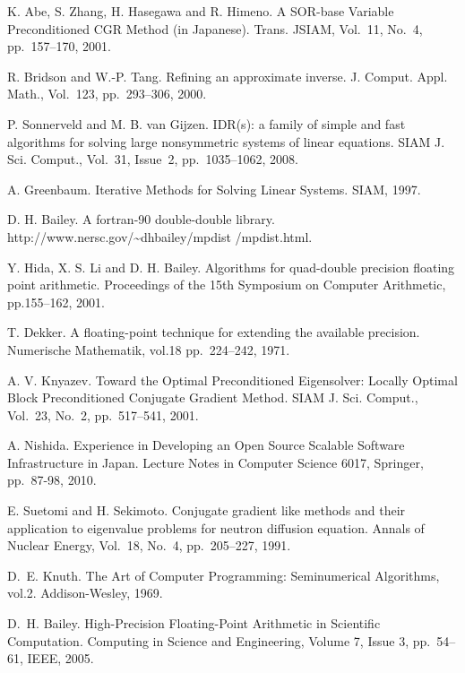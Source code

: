 \documentclass[a4paper]{article}
\begin{document}
\begin{thebibliography}{10}
K. Abe, S. Zhang, H. Hasegawa and R. Himeno.
\newblock A SOR-base Variable Preconditioned CGR Method (in Japanese).
\newblock Trans. JSIAM,  Vol.~11, No.~4, pp.\ 157--170, 2001.

R. Bridson and W.-P. Tang.
\newblock Refining an approximate inverse.
\newblock J. Comput. Appl. Math., Vol.~123, pp.\ 293--306, 2000. 

P. Sonnerveld and M. B. van Gijzen.
\newblock IDR(s): a family of simple and fast algorithms for solving large nonsymmetric systems of linear equations.
\newblock SIAM J. Sci. Comput., Vol.~31, Issue~2, pp.\ 1035--1062, 2008.

A. Greenbaum.
\newblock Iterative Methods for Solving Linear Systems.
\newblock SIAM, 1997.

D. H. Bailey.
\newblock A fortran-90 double-double library.
\newblock http://www.nersc.gov/\~{}dhbailey/mpdist /mpdist.html.

Y. Hida, X. S. Li and D. H. Bailey.
\newblock Algorithms for quad-double precision floating point arithmetic.
\newblock Proceedings of the 15th Symposium on Computer Arithmetic, pp.155--162, 2001.

T. Dekker.
\newblock A floating-point technique for extending the available precision.
\newblock Numerische Mathematik, vol.18 pp.\ 224--242, 1971.

A. V. Knyazev.
\newblock Toward the Optimal Preconditioned Eigensolver: Locally Optimal
        Block Preconditioned Conjugate Gradient Method.
\newblock SIAM J. Sci. Comput., Vol.~23, No.~2, pp.\ 517--541, 2001.

A. Nishida.
\newblock Experience in Developing an Open Source Scalable Software
	Infrastructure in Japan.
\newblock Lecture Notes in Computer Science 6017, Springer, pp.\ 87-98, 2010.

E. Suetomi and H. Sekimoto.
\newblock Conjugate gradient like methods and their application to
	eigenvalue problems for neutron diffusion equation.
\newblock Annals of Nuclear Energy, Vol.~18, No.~4, pp.\ 205--227, 1991.

D.~E. Knuth.
The Art of Computer Programming: Seminumerical Algorithms, vol.2.
Addison-Wesley, 1969.

D.~H. Bailey.
\newblock High-Precision Floating-Point Arithmetic in Scientific
	Computation.
\newblock Computing in Science and Engineering, Volume 7, Issue 3, pp.\ 54--61, IEEE, 2005.


\end{thebibliography}
\end{document}
